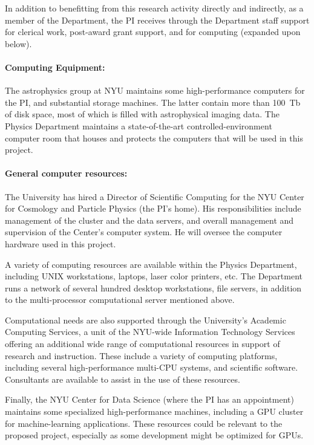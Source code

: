 \documentclass[12pt]{article}
\begin{document}
In addition to benefitting from this research activity directly and
indirectly, as a member of the Department, the PI receives through the
Department staff support for clerical work, post-award grant support,
and for computing (expanded upon below).

\paragraph{Computing Equipment:}
The astrophysics group at NYU maintains some high-performance computers
for the PI, and substantial storage machines.
The latter contain more than 100~Tb of disk space, most of which is filled
with astrophysical imaging data.  The Physics Department maintains a
state-of-the-art controlled-environment computer room that houses and
protects the computers that will be used in this project.

\paragraph{General computer resources:}
The University has hired a Director of Scientific Computing for the
NYU Center for Cosmology and Particle Physics (the PI's home).  His
responsibilities include management of the cluster and the data
servers, and overall management and supervision of the Center's
computer system.  He will oversee the computer hardware used in this
project.

A variety of computing resources are available within the Physics
Department, including UNIX workstations, laptops, laser color
printers, etc.  The Department runs a network of several hundred
desktop workstations, file servers, in addition to the multi-processor
computational server mentioned above.

Computational needs are also supported through the University's
Academic Computing Services, a unit of the NYU-wide Information
Technology Services offering an additional wide range of computational
resources in support of research and instruction.  These include a
variety of computing platforms, including several high-performance
multi-CPU systems, and scientific software.  Consultants are available
to assist in the use of these resources.

Finally, the NYU Center for Data Science (where the PI has an appointment)
maintains some specialized high-performance machines, including a GPU
cluster for machine-learning
applications. These resources could be relevant to the proposed project,
especially as some development might be optimized for GPUs.
\end{document}
